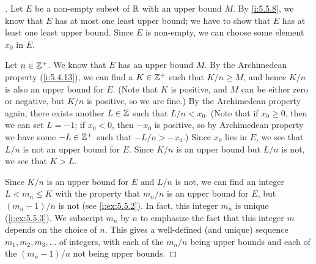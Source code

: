 \begin{proof}[]
  Let \(E\) be a non-empty subset of \(\mathbb{R}\) with an upper bound \(M\).
  By \cref{i:5.5.8}, we know that \(E\) has at most one least upper bound;
  we have to show that \(E\) has at least one least upper bound.
  Since \(E\) is non-empty, we can choose some element \(x_0\) in \(E\).

  Let \(n \in \mathbb{Z}^+\).
  We know that \(E\) has an upper bound \(M\).
  By the Archimedean property (\cref{i:5.4.13}), we can find a \(K \in \mathbb{Z}^+\) such that \(K / n \geq M\), and hence \(K / n\) is also an upper bound for \(E\).
  (Note that \(K\) is positive, and \(M\) can be either zero or negative, but \(K / n\) is positive, so we are fine.)
  By the Archimedean property again, there exists another \(L \in \mathbb{Z}\) such that \(L / n < x_0\).
  (Note that if \(x_0 \geq 0\), then we can set \(L = -1\); if \(x_0 < 0\), then \(-x_0\) is positive, so by Archimedean property we have some \(-L \in \mathbb{Z}^+\) such that \(-L / n > -x_0\).)
  Since \(x_0\) lies in \(E\), we see that \(L / n\) is not an upper bound for \(E\).
  Since \(K / n\) is an upper bound but \(L / n\) is not, we see that \(K > L\).

  Since \(K / n\) is an upper bound for \(E\) and \(L / n\) is not, we can find an integer \(L < m_n \leq K\) with the property that \(m_n / n\) is an upper bound for \(E\), but \((m_n - 1) / n\) is not (see \cref{i:ex:5.5.2}).
  In fact, this integer \(m_n\) is unique (\cref{i:ex:5.5.3}).
  We subscript \(m_n\) by \(n\) to emphasize the fact that this integer \(m\) depends on the choice of \(n\).
  This gives a well-defined (and unique) sequence \(m_1, m_2, m_3, \dots\) of integers, with each of the \(m_n / n\) being upper bounds and each of the \((m_n - 1) / n\) not being upper bounds.


\end{proof}
